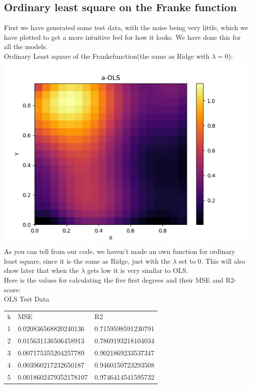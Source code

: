 \documentclass[a4paper,norsk]{article}
\begin{document}
\subsection{Ordinary least square on the Franke function}
First we have generated some test data, with the noise being very little, 
which we have plotted to get a more intuitive feel for how it looks. 
We have done this for all the models.
\\Ordinary Least square of the Frankefunction(the same as Ridge with $\lambda=0$):
\\ \includegraphics[scale=.7]{a-OLS}
\\As you can tell from our code, we haven't made an own function for ordinary least square, since it is the same as Ridge, just with the $\lambda$ set to 0. This will also show later that when the $\lambda$ gets low it is very similar to OLS.
\\Here is the values for calculating the five first degrees and their MSE and  R2-score:
\\OLS Test Data
\begin{table}[!h]
\begin{tabular}{lll}
k & MSE                   & R2                 \\
1 & 0.020836568820240136  & 0.7159598591230791 \\
2 & 0.015631136506458913  & 0.7869193218104034 \\
3 & 0.007175355204257789  & 0.9021869233537347 \\
4 & 0.003960217232650187  & 0.9460150723293508 \\
5 & 0.0018602479352178107 & 0.9746414541595732
\end{tabular}
\end{table}
\end{document}

